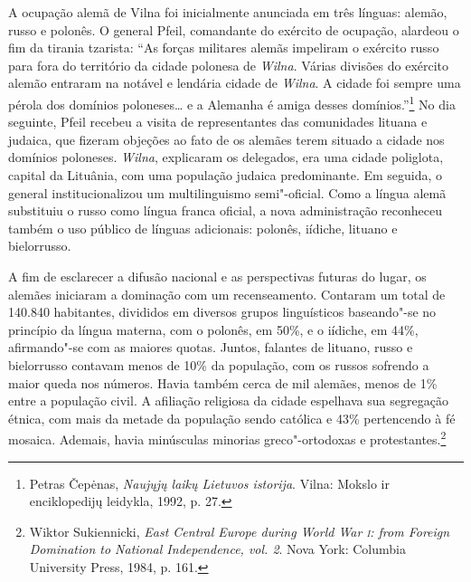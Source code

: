A ocupação alemã de Vilna foi inicialmente anunciada em três línguas:
alemão, russo e polonês. O general Pfeil, comandante do exército de
ocupação, alardeou o fim da tirania tzarista: ``As forças militares
alemãs impeliram o exército russo para fora do território da cidade
polonesa de \textit{Wilna}. Várias divisões do exército alemão entraram na
notável e lendária cidade de \textit{Wilna}. A cidade foi sempre uma pérola dos
domínios poloneses\ldots{} e a Alemanha é amiga desses
domínios.''\footnote{Petras Čepėnas, \textit{Naujųjų laikų Lietuvos istorija}. Vilna: Mokslo ir enciklopedijų leidykla, 1992, p. 27.} No dia seguinte, Pfeil recebeu a visita de representantes das comunidades lituana e judaica, que fizeram objeções ao fato de os
alemães terem situado a cidade nos domínios poloneses. \textit{Wilna}, explicaram
os delegados, era uma cidade poliglota, capital da Lituânia, com uma
população judaica predominante. Em seguida, o general institucionalizou
um multilinguismo semi"-oficial. Como a língua alemã substituiu o russo
como língua franca oficial, a nova administração reconheceu
também o uso público de línguas adicionais: polonês, iídiche, lituano e
bielorrusso.

A fim de esclarecer a difusão nacional e as perspectivas futuras do
lugar, os alemães iniciaram a dominação com um recenseamento. Contaram
um total de 140.840 habitantes, divididos em diversos grupos
linguísticos baseando"-se no princípio da língua materna, com o polonês, em 50\%, e o iídiche, em 44\%, afirmando"-se com as maiores quotas. Juntos,
falantes de lituano, russo e bielorrusso contavam menos de 10\% da
população, com os russos sofrendo a maior queda nos números. Havia
também cerca de mil alemães, menos de 1\% entre a população civil. A
afiliação religiosa da cidade espelhava sua segregação étnica, com mais
da metade da população sendo católica e 43\% pertencendo à fé mosaica.
Ademais, havia minúsculas minorias greco"-ortodoxas e
protestantes.\footnote{Wiktor Sukiennicki, \textit{East Central Europe during World War \textsc{i}: from Foreign Domination to National Independence, vol. 2}. Nova York: Columbia University Press, 1984, p. 161.}

